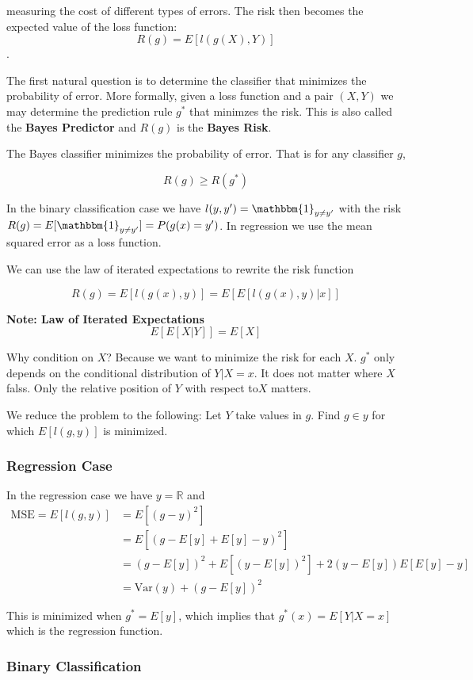 \documentclass[12pt, authoryear]{elsarticle}
\begin{document}
measuring the cost of different types of errors. The risk then becomes the expected value of the loss function: $$R(g) = E[l(g(X),Y)]$$. 

The first natural question is to determine the classifier that minimizes the probability of error. More formally, given a loss function and a pair $(X,Y)$ we may determine the prediction rule $g^*$ that minimzes the risk. This is also called the \textbf{Bayes Predictor} and $R(g)$ is the \textbf{Bayes Risk}.

The Bayes classifier minimizes the probability of error. That is for any classifier $g$,

$$ R(g) \geq R(g^*)$$


In the binary classification case we have $l(y , y') = \mathbbm{1}_{y \neq y'}$ with the risk $R(g) = E[ \mathbbm{1}_{y \neq y'}] = P(g(x) = y')$. In regression we use the mean squared error as a loss function. 

We can use the law of iterated expectations to rewrite the risk function

$$R(g) = E[ l(g(x),y)] = E[ E[l(g(x),y)|x]]$$ 

\textbf{Note: Law of Iterated Expectations}
$$ E[ E[X | Y]]  = E[X]$$

Why condition on $X$? Because we want to minimize the risk for each $X$.  $g^*$ only depends on the conditional distribution of $Y|X=x$. It does not matter where $X$ falss. Only the relative position of $Y$ with respect to$X$ matters. 

We reduce the problem to the following: Let $Y$ take values in $g$. Find $g \in y$ for which $E[l(g,y)]$ is minimized.

\subsubsection{Regression Case}
In the regression case we have $y=\mathbb{R}$ and 
\begin{equation*}
\begin{split}
\text{MSE} = E[l(g,y)] &= E[(g-y)^2] \\
&= E[(g - E[y] + E[y] -y)^2] \\
&= (g-E[y])^2 + E[(y- E[y])^2] + 2(y-E[y])E[E[y]-y] \\
&= \text{Var}(y) + (g-E[y])^2
\end{split}
\end{equation*}

This is minimized when $g^* = E[y]$, which implies that $g^*(x) = E[Y|X=x]$ which is the regression function. 


\subsubsection{Binary Classification}
\end{document}
